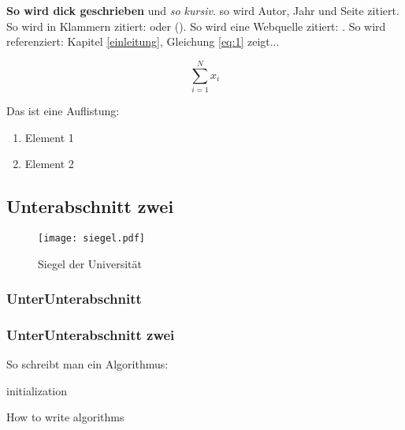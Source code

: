 \documentclass[12pt,oneside]{article}
\begin{document}
\textbf{So wird dick geschrieben} und \textit{so kursiv}. \citet[580]{clemen1989combining} so wird Autor, Jahr und Seite zitiert. So wird in Klammern zitiert: \citep[580]{clemen1989combining} oder (\cites[580]{clemen1989combining}[548]{gilabert2006intelligent}). So wird eine Webquelle zitiert: \citet{shiny1}. So wird referenziert: Kapitel \ref{einleitung}, Gleichung \ref{eq:1} zeigt...

\begin{equation}
    \sum_{i=1}^N x_i
    \label{eq:1}
\end{equation}

Das ist eine Auflistung:

\begin{enumerate}
\item Element 1
\item Element 2
\end{enumerate}


\blindtext

\subsection{Unterabschnitt zwei}

\blindtext

\begin{figure}[H]
    \centering
    \texttt{[image: siegel.pdf]}
    \caption{Siegel der Universität}
    \label{fig:my_label}
\end{figure}

\subsubsection{UnterUnterabschnitt}

\blindtext

\subsubsection{UnterUnterabschnitt zwei}
So schreibt man ein Algorithmus:
\\
\begin{algorithm}[H]
 initialization\;
 \caption{How to write algorithms}
\end{algorithm}
\BlankLine
\end{document}
